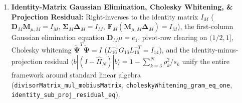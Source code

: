 \documentclass[11pt,a4paper]{article}
\theoremstyle{definition}
\begin{document}
\begin{enumerate}[leftmargin=1.8em,itemsep=2pt]
\item \textbf{Identity-Matrix Gaussian Elimination, Cholesky Whitening, \& Projection Residual:} Right-inverses to the identity matrix $I_M$ ($\mathbf{D}_M \mathbf{M}_{\mu,M} = I_M$, $\mathbf{\Sigma}_M \mathbf{\Delta}_M = I_M$, $\mathbf{F}_M (\mathbf{M}_{\mu,M} \mathbf{\Delta}_M) = I_M$), the first-column Gaussian elimination equation $\mathbf{D}_M \mu = e_1$, pivot-row clearing on $(1/2,1]$, Cholesky whitening $\widetilde{\mathbf{\Psi}}^T \widetilde{\mathbf{\Psi}} = I$ ($L_{16}^{-1} G_{16} L_{16}^{-T} = I_{14}$), and the identity-minus-projection residual $\langle b | (I - \widehat{\Pi}_N) | b \rangle = 1 - \sum_{k=3}^N \rho_k^2/s_k$ unify the entire framework around standard linear algebra (\texttt{divisorMatrix\_mul\_mobiusMatrix}, \texttt{choleskyWhitening\_gram\_eq\_one}, \texttt{identity\_sub\_proj\_residual\_eq}).
\end{enumerate}
\end{document}
